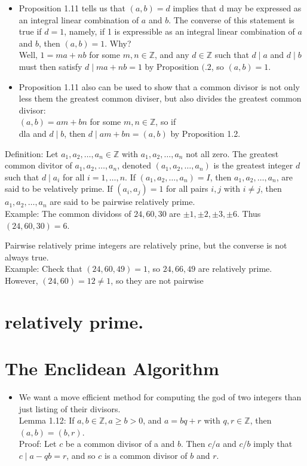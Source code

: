 \documentclass[10pt]{article}
\begin{document}
\begin{itemize}
  \item Proposition 1.11 tells us that $(a, b)=d$ implies that d may be expressed as an integral linear combination of $a$ and $b$. The converse of this statement is true if $d=1$, namely, if 1 is expressible as an integral linear combination of $a$ and $b$, then $(a, b)=1$. Why?\\
Well, $1=m a+n b$ for some $m, n \in \mathbb{Z}$, and any $d \in \mathbb{Z}$ such that $d \mid a$ and $d \mid b$ must then satisfy $d \mid m a+n b=1$ by Proposition $(.2$, so $(a, b)=1$.
  \item Proposition 1.11 also can be used to show that a common divisor is not only less them the greatest common diviser, but also divides the greatest common divisor:\\
$(a, b)=a m+b n$ for some $m, n \in \mathbb{Z}$, so if\\
dla and $d \mid b$, then $d \mid a m+b n=(a, b)$ by Proposition 1.2.
\end{itemize}

Definition: Let $a_{1}, a_{2}, \ldots, a_{n} \in \mathbb{Z}$ with $a_{1}, a_{2}, \ldots, a_{n}$ not all zero. The greatest common divitor of $a_{1}, a_{2}, \ldots, a_{n}$, denoted $\left(a_{1}, a_{2}, \ldots, a_{n}\right)$ is the greatest integer $d$ such that $d \mid a_{i}$ for all $i=1, \ldots, n$. If $\left(a_{1}, a_{2}, \ldots, a_{n}\right)=I$, then $a_{1}, a_{2}, \ldots, a_{n}$, are said to be velatively prime. If $\left(a_{i}, a_{j}\right)=1$ for all pairs $i, j$ with $i \neq j$, then $a_{1}, a_{2}, \ldots, a_{n}$ are said to be pairwise relatively prime.\\
Example: The common dividoss of $24,60,30$ are $\pm 1, \pm 2, \pm 3, \pm 6$. Thus $(24,60,30)=6$.

Pairwise relatively prime integers are relatively prine, but the converse is not always true.\\
Example: Check that $(24,60,49)=1$, so $24,66,49$ are relatively prime. However, $(24,60)=12 \neq 1$, so they are not pairwise

\section*{relatively prime.}
\section*{The Enclidean Algorithm}
\begin{itemize}
  \item We want a move efficient method for computing the god of two integers than just listing of their divisors.\\
Lemma 1.12: If $a, b \in \mathbb{Z}, a \geqslant b>0$, and $a=b q+r$ with $q, r \in \mathbb{Z}$, then $(a, b)=(b, r)$.\\
Proof: Let $c$ be a common divisor of a and $b$. Then $c / a$ and $c / b$ imply that $c \mid a-q b=r$, and so $c$ is a common divisor of $b$ and $r$.
\end{itemize}
\end{document}

